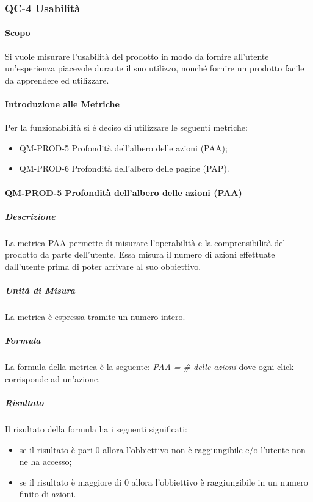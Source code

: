 		\subsubsection{QC-4 Usabilità}
			\paragraph{Scopo}
			Si vuole misurare l'usabilità del prodotto in modo da fornire all'utente un'esperienza piacevole durante il suo utilizzo, nonché fornire un prodotto facile da apprendere ed utilizzare.
			\paragraph{Introduzione alle Metriche}
				Per la funzionabilità si é deciso di utilizzare le seguenti metriche:
				\begin{itemize}
					\item QM-PROD-5 Profondità dell'albero delle azioni (PAA);
					\item QM-PROD-6 Profondità dell'albero delle pagine (PAP).
				\end{itemize}
			\paragraph{QM-PROD-5 Profondità dell'albero delle azioni (PAA)}
				\subparagraph{Descrizione}
					La metrica PAA permette di misurare l'operabilità e la comprensibilità del prodotto da parte dell'utente. Essa misura il numero di azioni effettuate dall'utente prima di poter arrivare al suo obbiettivo.
				\subparagraph{Unità di Misura}
					La metrica è espressa tramite un numero intero.
				\subparagraph{Formula}
					La formula della metrica è la seguente:
					\textit{PAA = \# delle azioni}
					dove ogni click corrisponde ad un'azione.
				\subparagraph{Risultato}
					Il risultato della formula ha i seguenti significati:
					\begin{itemize}
						\item se il risultato è pari 0 allora l'obbiettivo non è raggiungibile e/o l'utente non ne ha accesso;
						\item se il risultato è maggiore di 0 allora l'obbiettivo è raggiungibile in un numero finito di azioni.
					\end{itemize}
